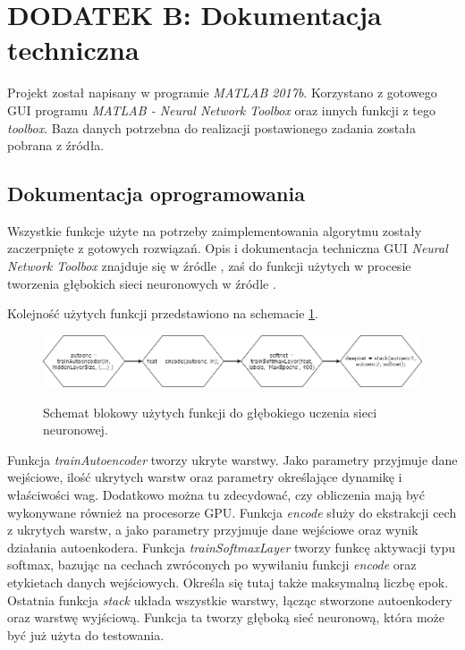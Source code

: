 \section{DODATEK B: Dokumentacja techniczna}
\label{sub:dodatekB}

Projekt został napisany w programie \textit{MATLAB 2017b}. Korzystano z gotowego GUI programu \textit{MATLAB - Neural Network Toolbox} oraz innych funkcji z tego \textit{toolbox}. Baza danych potrzebna do realizacji postawionego zadania została pobrana z źródła.

\subsection{Dokumentacja oprogramowania}
\label{sub:dokumentacja}

Wszystkie funkcje użyte na potrzeby zaimplementowania algorytmu zostały zaczerpnięte z gotowych rozwiązań. Opis i dokumentacja techniczna GUI \textit{Neural Network Toolbox} znajduje się w źródle \cite{gui}, zaś do funkcji użytych w procesie tworzenia głębokich sieci neuronowych w źródle \cite{funkcje}.

Kolejność użytych funkcji przedstawiono na schemacie \ref{fig:flow}.

\begin{figure}[H]
	\centering
	\includegraphics[scale=0.45]{obrazki/flow}
	\caption{\label{fig:subcaption_example}Schemat blokowy użytych funkcji do głębokiego uczenia sieci neuronowej.}{\label{fig:flow}}
\end{figure}

Funkcja \textit{trainAutoencoder} tworzy ukryte warstwy. Jako parametry przyjmuje dane wejściowe, ilość ukrytych warstw oraz parametry określające dynamikę i właściwości wag. Dodatkowo można tu zdecydować, czy obliczenia mają być wykonywane również na procesorze GPU. Funkcja \textit{encode} służy do ekstrakcji cech z ukrytych warstw, a jako parametry przyjmuje dane wejściowe oraz wynik działania autoenkodera. Funkcja \textit{trainSoftmaxLayer} tworzy funkcę aktywacji typu softmax, bazując na cechach zwróconych po wywiłaniu funkcji \textit{encode} oraz etykietach danych wejściowych. Określa się tutaj także maksymalną liczbę epok. Ostatnia funkcja \textit{stack} układa wszystkie warstwy, łącząc stworzone autoenkodery oraz warstwę wyjściową. Funkcja ta tworzy głęboką sieć neuronową, która może być już użyta do testowania.


